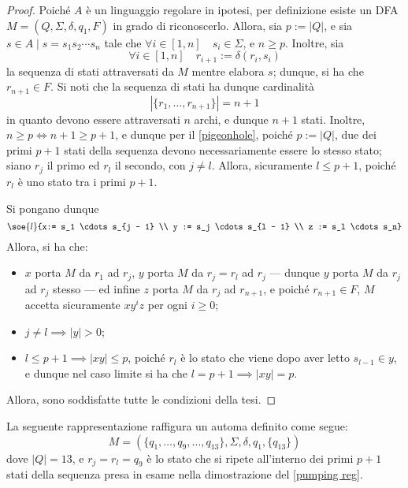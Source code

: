 \documentclass[a4paper, 12pt]{report}
\begin{document}
    \begin{proof}
        Poiché $A$ è un linguaggio regolare in ipotesi, per definizione esiste un DFA $M = (Q, \Sigma, \delta, q_1, F)$ in grado di riconoscerlo. Allora, sia $p := |Q|$, e sia $s \in A \mid s = s_1 s_2 \cdots s_n$ tale che $\forall i \in [1, n] \quad s_i \in \Sigma$, e $n \ge p$. Inoltre, sia $$\forall i \in [1, n] \quad r_{i + 1} := \delta(r_i, s_i)$$ la sequenza di stati attraversati da $M$ mentre elabora $s$; dunque, si ha che $r_{n + 1} \in F$. Si noti che la sequenza di stati ha dunque cardinalità $$|\{r_1, \ldots, r_{n + 1}\}| = n + 1$$ in quanto devono essere attraversati $n$ archi, e dunque $n + 1$ stati. Inoltre, $n \ge p \iff n + 1 \ge p + 1$, e dunque per il \cref{pigeonhole}, poiché $p := |Q|$, due dei primi $p + 1$ stati della sequenza devono necessariamente essere lo stesso stato; siano $r_j$ il primo ed $r_l$ il secondo, con $j \neq l$. Allora, sicuramente $l \le p + 1$, poiché $r_l$ è uno stato tra i primi $p + 1$.

        Si pongano dunque $$\soe{l}{x:= s_1 \cdots s_{j - 1} \\ y := s_j \cdots s_{l - 1} \\ z := s_l \cdots s_n}$$ Allora, si ha che:

        \begin{itemize}
            \item $x$ porta $M$ da $r_1$ ad $r_j$, $y$ porta $M$ da $r_j = r_l$ ad $r_j$ --- dunque $y$ porta $M$ da $r_j$ ad $r_j$ stesso --- ed infine $z$ porta $M$ da $r_j$ ad $r_{n + 1}$, e poiché $r_{n + 1} \in F$, $M$ accetta sicuramente $xy^iz$ per ogni $i \ge 0$;
            \item $j \neq l \implies |y| > 0$;
            \item $l \le p + 1 \implies |xy| \le p$, poiché $r_l$ è lo stato che viene dopo aver letto $s_{l - 1} \in y$, e dunque nel caso limite si ha che $l = p + 1 \implies |xy| = p$.
        \end{itemize}

        Allora, sono soddisfatte tutte le condizioni della tesi.
    \end{proof}

    \begin{example}
        La seguente rappresentazione raffigura un automa definito come segue: $$M = (\{q_1, \ldots, q_9, \ldots, q_{13}\}, \Sigma, \delta, q_1, \{q_{13}\})$$ dove $|Q| = 13$, e $r_j = r_l = q_9$ è lo stato che si ripete all'interno dei primi $p + 1$ stati della sequenza presa in esame nella dimostrazione del \cref{pumping reg}.

    \end{example}
\end{document}
